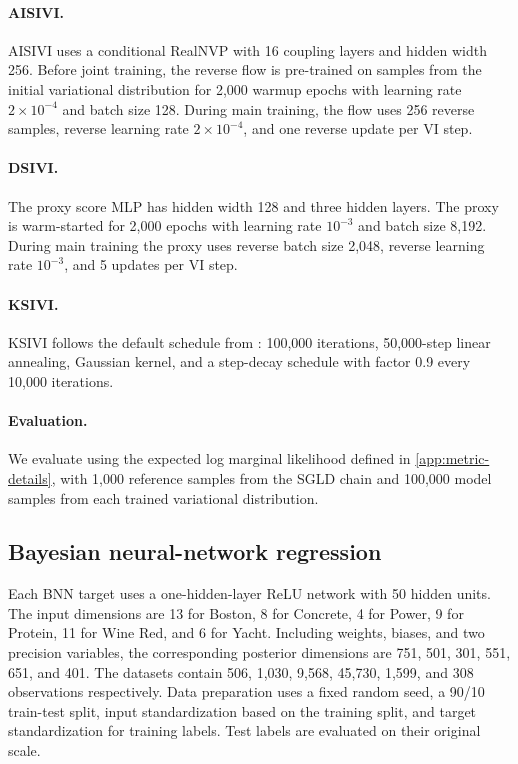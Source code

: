\paragraph{AISIVI.}
AISIVI uses a conditional RealNVP with 16 coupling layers and hidden width 256.  Before joint training, the reverse flow is pre-trained on samples from the initial variational distribution for 2,000 warmup epochs with learning rate $2 \times 10^{-4}$ and batch size 128.  During main training, the flow uses 256 reverse samples, reverse learning rate $2 \times 10^{-4}$, and one reverse update per VI step.

\paragraph{DSIVI.}
The proxy score MLP has hidden width 128 and three hidden layers.  The proxy is warm-started for 2,000 epochs with learning rate $10^{-3}$ and batch size 8,192.  During main training the proxy uses reverse batch size 2,048, reverse learning rate $10^{-3}$, and 5 updates per VI step.

\paragraph{KSIVI.}
KSIVI follows the default schedule from \citet{cheng2024kernel}: 100,000 iterations, 50,000-step linear annealing, Gaussian kernel, and a step-decay schedule with factor 0.9 every 10,000 iterations.

\paragraph{Evaluation.}
We evaluate using the expected log marginal likelihood defined in \cref{app:metric-details}, with 1,000 reference samples from the SGLD chain and 100,000 model samples from each trained variational distribution.

\subsection{Bayesian neural-network regression}
\label{app:bnn-details}

Each BNN target uses a one-hidden-layer ReLU network with 50 hidden units.  The input dimensions are 13 for Boston, 8 for Concrete, 4 for Power, 9 for Protein, 11 for Wine Red, and 6 for Yacht.  Including weights, biases, and two precision variables, the corresponding posterior dimensions are 751, 501, 301, 551, 651, and 401.  The datasets contain 506, 1,030, 9,568, 45,730, 1,599, and 308 observations respectively.  Data preparation uses a fixed random seed, a 90/10 train-test split, input standardization based on the training split, and target standardization for training labels.  Test labels are evaluated on their original scale.

